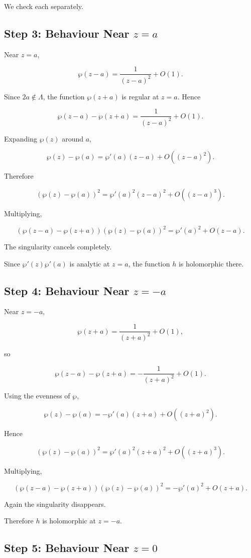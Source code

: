 \documentclass[12pt,a4paper]{article}
\theoremstyle{notespace}
\begin{document}
We check each separately.

\subsection{Step 3: Behaviour Near \(z=a\)}

Near \(z=a\),

\[
\wp(z-a)
=
\frac{1}{(z-a)^2}+O(1).
\]

Since \(2a\notin\Lambda\), the function \(\wp(z+a)\) is regular at \(z=a\). Hence

\[
\wp(z-a)-\wp(z+a)
=
\frac{1}{(z-a)^2}+O(1).
\]

Expanding \(\wp(z)\) around \(a\),

\[
\wp(z)-\wp(a)
=
\wp'(a)(z-a)+O((z-a)^2).
\]

Therefore

\[
(\wp(z)-\wp(a))^2
=
\wp'(a)^2(z-a)^2+O((z-a)^3).
\]

Multiplying,

\[
(\wp(z-a)-\wp(z+a))
(\wp(z)-\wp(a))^2
=
\wp'(a)^2+O(z-a).
\]

The singularity cancels completely.

Since \(\wp'(z)\wp'(a)\) is analytic at \(z=a\), the function \(h\) is holomorphic there.

\subsection{Step 4: Behaviour Near \(z=-a\)}

Near \(z=-a\),

\[
\wp(z+a)
=
\frac{1}{(z+a)^2}+O(1),
\]

so

\[
\wp(z-a)-\wp(z+a)
=
-\frac{1}{(z+a)^2}+O(1).
\]

Using the evenness of \(\wp\),

\[
\wp(z)-\wp(a)
=
-\wp'(a)(z+a)+O((z+a)^2).
\]

Hence

\[
(\wp(z)-\wp(a))^2
=
\wp'(a)^2(z+a)^2+O((z+a)^3).
\]

Multiplying,

\[
(\wp(z-a)-\wp(z+a))
(\wp(z)-\wp(a))^2
=
-\wp'(a)^2+O(z+a).
\]

Again the singularity disappears.

Therefore \(h\) is holomorphic at \(z=-a\).

\subsection{Step 5: Behaviour Near \(z=0\)}
\end{document}
